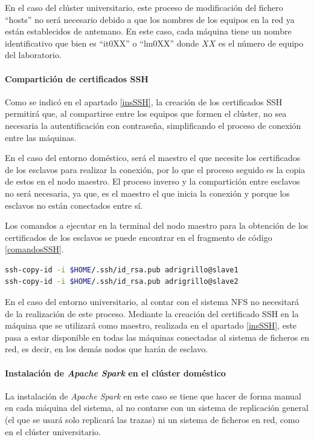 En el caso del clúster universitario, este proceso de modificación del fichero ``hosts'' no será necesario debido a que los nombres de los equipos en la red ya están establecidos de antemano. En este caso, cada máquina tiene un nombre identificativo que bien es ``it0XX'' o ``lm0XX'' donde $XX$ es el número de equipo del laboratorio.

\paragraph{Compartición de certificados \gls{SSH}}
Como se indicó en el apartado \ref{insSSH}, la creación de los certificados \gls{SSH} permitirá que, al compartirse entre los equipos que formen el clúster, no sea necesaria la autentificación con contraseña, simplificando el proceso de conexión entre las máquinas.

En el caso del entorno doméstico, será el maestro el que necesite los certificados de los esclavos para realizar la conexión, por lo que el proceso seguido es la copia de estos en el nodo maestro. El proceso inverso y la compartición entre esclavos no será necesaria, ya que, es el maestro el que inicia la conexión y porque los esclavos no están conectados entre sí.

Los comandos a ejecutar en la terminal del nodo maestro para la obtención de los certificados de los esclavos se puede encontrar en el fragmento de código \ref{comandosSSH}.

\begin{lstlisting}[label=comandosSSH,language=sh,frame=single,caption=Obtención de los certificados \gls{SSH} de los esclavos por parte del maestro en el clúster doméstico]
ssh-copy-id -i $HOME/.ssh/id_rsa.pub adrigrillo@slave1
ssh-copy-id -i $HOME/.ssh/id_rsa.pub adrigrillo@slave2
\end{lstlisting}

En el caso del entorno universitario, al contar con el sistema \gls{NFS} no necesitará de la realización de este proceso. Mediante la creación del certificado \gls{SSH} en la máquina que se utilizará como maestro, realizada en el apartado \ref{insSSH}, este pasa a estar disponible en todas las máquinas conectadas al sistema de ficheros en red, es decir, en los demás nodos que harán de esclavo.

\paragraph{Instalación de \textit{Apache Spark} en el clúster doméstico}
La instalación de \textit{Apache Spark} en este caso se tiene que hacer de forma manual en cada máquina del sistema, al no contarse con un sistema de replicación general (el que se usará solo replicará las trazas) ni un sistema de ficheros en red, como en el clúster universitario.

